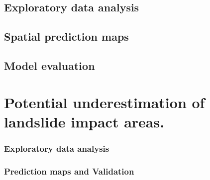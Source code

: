 \subsection{Exploratory data analysis}

{\textcolor{red}{ \lipsum[1]}}

\subsection{Spatial prediction maps}

{\textcolor{red}{ \lipsum[1]}}


\subsection{Model evaluation}
{\textcolor{red}{ \lipsum[1]}}



\section{Potential underestimation of landslide impact areas.} \label{results_dantas}
\subsubsection*{Exploratory data analysis}
{\textcolor{red}{ \lipsum[1]}}




\subsubsection*{Prediction maps and Validation}
{\textcolor{red}{ \lipsum[1]}}